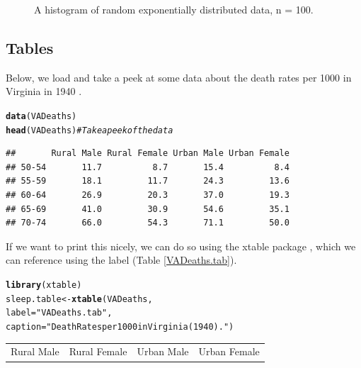 \documentclass{article}\usepackage[]{graphicx}\usepackage[]{xcolor}
\makeatletter
\newcommand{\hlsng}[1]{\textcolor[rgb]{0.192,0.494,0.8}{#1}}%
\newcommand{\hlcom}[1]{\textcolor[rgb]{0.678,0.584,0.686}{\textit{#1}}}%
\newcommand{\hldef}[1]{\textcolor[rgb]{0.345,0.345,0.345}{#1}}%
\newcommand{\hlkwb}[1]{\textcolor[rgb]{0.69,0.353,0.396}{#1}}%
\newcommand{\hlkwc}[1]{\textcolor[rgb]{0.333,0.667,0.333}{#1}}%
\newcommand{\hlkwd}[1]{\textcolor[rgb]{0.737,0.353,0.396}{\textbf{#1}}}%
\newenvironment{kframe}{%
 \def\at@end@of@kframe{}%
 \ifinner\ifhmode%
  \def\at@end@of@kframe{\end{minipage}}%
  \begin{minipage}{\columnwidth}%
 \fi\fi%
 \def\FrameCommand##1{\hskip\@totalleftmargin \hskip-\fboxsep
 \colorbox{shadecolor}{##1}\hskip-\fboxsep
     \hskip-\linewidth \hskip-\@totalleftmargin \hskip\columnwidth}%
 \MakeFramed {\advance\hsize-\width
   \@totalleftmargin\z@ \linewidth\hsize
   \@setminipage}}%
 {\par\unskip\endMakeFramed%
 \at@end@of@kframe}
\newenvironment{knitrout}{}{} %
\makeatother
\begin{document}
\begin{multicols}{2}
\begin{figure}[H]
\begin{center}
\end{center}
\caption{A histogram of random exponentially distributed data, n = 100.}
\label{Figure 1}
\end{figure}

\columnbreak
\subsection{Tables}
Below, we load and take a peek at some data about the death
rates per 1000 in Virginia in 1940 \citep{molyneaux1947differences}.
\begin{knitrout}\scriptsize
{}\color{fgcolor}\begin{kframe}
\begin{alltt}
\hlkwd{data}\hldef{(VADeaths)}
\hlkwd{head}\hldef{(VADeaths)} \hlcom{# Take a peek of the data}
\end{alltt}
\begin{verbatim}
##       Rural Male Rural Female Urban Male Urban Female
## 50-54       11.7          8.7       15.4          8.4
## 55-59       18.1         11.7       24.3         13.6
## 60-64       26.9         20.3       37.0         19.3
## 65-69       41.0         30.9       54.6         35.1
## 70-74       66.0         54.3       71.1         50.0
\end{verbatim}
\end{kframe}
\end{knitrout}
  If we want to print this nicely, we can do so using the
xtable package \citep{xtable}, which we can reference
using the label (Table \ref{VADeaths.tab}).
\begin{knitrout}\scriptsize
{}\color{fgcolor}\begin{kframe}
\begin{alltt}
\hlkwd{library}\hldef{(xtable)}
\hldef{sleep.table}\hlkwb{<-}\hlkwd{xtable}\hldef{(VADeaths ,}
                    \hlkwc{label} \hldef{=} \hlsng{"VADeaths.tab"}\hldef{,}
                    \hlkwc{caption} \hldef{=} \hlsng{"Death Rates per 1000 in Virginia (1940)."}\hldef{)}
\end{alltt}
\end{kframe}
\end{knitrout}
\begin{table}[H]
\centering
\begingroup\small
\begin{tabular}{rrrr}
  \hline
Rural Male & Rural Female & Urban Male & Urban Female \\ 

\end{tabular}
\end{table}
\end{multicols}
\end{document}
